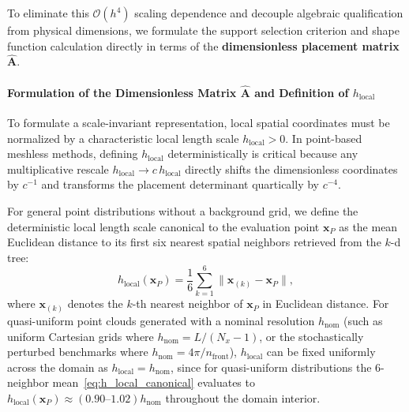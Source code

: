 \documentclass[preprint,12pt]{elsarticle}
\begin{document}
To eliminate this $\mathcal{O}(h^4)$ scaling dependence and decouple algebraic qualification from physical dimensions, we formulate the support selection criterion and shape function calculation directly in terms of the \textbf{dimensionless placement matrix} $\widehat{\mathbf{A}}$.

\paragraph{Formulation of the Dimensionless Matrix $\widehat{\mathbf{A}}$ and Definition of $h_{\mathrm{local}}$}
To formulate a scale-invariant representation, local spatial coordinates must be normalized by a characteristic local length scale $h_{\mathrm{local}} > 0$. In point-based meshless methods, defining $h_{\mathrm{local}}$ deterministically is critical because any multiplicative rescale $h_{\mathrm{local}} \to c \, h_{\mathrm{local}}$ directly shifts the dimensionless coordinates by $c^{-1}$ and transforms the placement determinant quartically by $c^{-4}$. 

For general point distributions without a background grid, we define the deterministic local length scale canonical to the evaluation point $\mathbf{x}_P$ as the mean Euclidean distance to its first six nearest spatial neighbors retrieved from the $k$-d tree:
\begin{equation}
h_{\mathrm{local}}(\mathbf{x}_P) = \frac{1}{6} \sum_{k=1}^6 \|\mathbf{x}_{(k)} - \mathbf{x}_P\|,
\label{eq:h_local_canonical}
\end{equation}
where $\mathbf{x}_{(k)}$ denotes the $k$-th nearest neighbor of $\mathbf{x}_P$ in Euclidean distance. For quasi-uniform point clouds generated with a nominal resolution $h_{\mathrm{nom}}$ (such as uniform Cartesian grids where $h_{\mathrm{nom}} = L / (N_x - 1)$, or the stochastically perturbed benchmarks where $h_{\mathrm{nom}} = 4\pi / n_{\mathrm{front}}$), $h_{\mathrm{local}}$ can be fixed uniformly across the domain as $h_{\mathrm{local}} = h_{\mathrm{nom}}$, since for quasi-uniform distributions the 6-neighbor mean~\eqref{eq:h_local_canonical} evaluates to $h_{\mathrm{local}}(\mathbf{x}_P) \approx (0.90\text{--}1.02) h_{\mathrm{nom}}$ throughout the domain interior.
\end{document}
